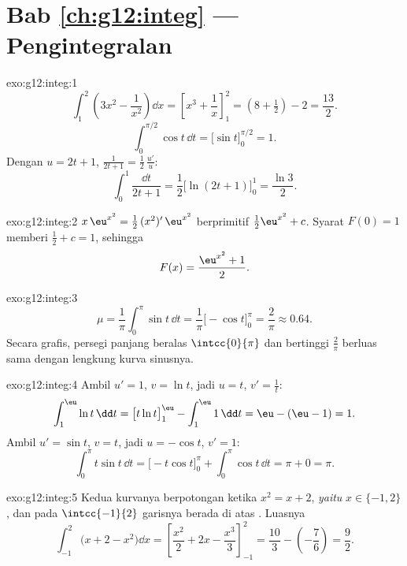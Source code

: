 \section*{Bab \ref{ch:g12:integ} --- Pengintegralan}

\begin{solution}{exo:g12:integ:1}
\[
\int_1^2 \left(3x^2 - \frac{1}{x^2}\right)\dd x
= \left[x^3 + \frac1x\right]_1^2 = \left(8 + \tfrac12\right) - 2 = \frac{13}{2}.
\]
\[
\int_0^{\pi/2} \cos t\,\dd t = \bigl[\sin t\bigr]_0^{\pi/2} = 1 .
\]
Dengan $u = 2t+1$, $\frac{1}{2t+1} = \frac12\,\frac{u'}{u}$:
\[
\int_0^1 \frac{\dd t}{2t+1} = \frac12\bigl[\ln(2t+1)\bigr]_0^1
= \frac{\ln 3}{2}.
\]
\end{solution}

\begin{solution}{exo:g12:integ:2}
$x\,\eu^{x^2} = \frac12\,(x^2)'\,\eu^{x^2}$ berprimitif
$\frac12\eu^{x^2} + c$. Syarat $F(0) = 1$ memberi $\frac12 + c = 1$,
sehingga
\[
F(x) = \frac{\eu^{x^2} + 1}{2}.
\]
\end{solution}

\begin{solution}{exo:g12:integ:3}
\[
\mu = \frac{1}{\pi}\int_0^\pi \sin t\,\dd t
= \frac{1}{\pi}\bigl[-\cos t\bigr]_0^\pi = \frac{2}{\pi} \approx 0.64 .
\]
Secara grafis, persegi panjang beralas $\intcc{0}{\pi}$ dan bertinggi
$\frac{2}{\pi}$ berluas sama dengan lengkung kurva sinusnya.
\end{solution}

\begin{solution}{exo:g12:integ:4}
Ambil $u' = 1$, $v = \ln t$, jadi $u = t$, $v' = \frac1t$:
\[
\int_1^{\eu} \ln t\,\dd t = \bigl[t\ln t\bigr]_1^{\eu} - \int_1^{\eu} 1\,\dd t
= \eu - (\eu - 1) = 1 .
\]
Ambil $u' = \sin t$, $v = t$, jadi $u = -\cos t$, $v' = 1$:
\[
\int_0^\pi t\sin t\,\dd t = \bigl[-t\cos t\bigr]_0^\pi + \int_0^\pi \cos t\,\dd t
= \pi + 0 = \pi .
\]
\end{solution}

\begin{solution}{exo:g12:integ:5}
Kedua kurvanya berpotongan ketika $x^2 = x + 2$, \emph{yaitu} $x \in \{-1, 2\}$,
dan pada $\intcc{-1}{2}$ garisnya berada di atas . Luasnya
\[
\int_{-1}^{2} \bigl(x + 2 - x^2\bigr)\dd x
= \left[\frac{x^2}{2} + 2x - \frac{x^3}{3}\right]_{-1}^{2}
= \frac{10}{3} - \left(-\frac{7}{6}\right) = \frac{9}{2}.
\]
\end{solution}

